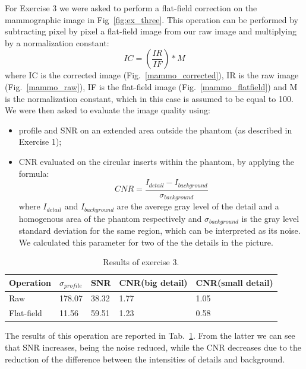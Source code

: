 \documentclass[a4paper]{article}
\begin{document}
For Exercise 3 we were asked to perform a flat-field correction on the mammographic image in Fig~\ref{fig:ex_three}. This operation can be performed by subtracting pixel by pixel a flat-field image from our raw image and multiplying by a normalization constant:
\begin{equation}
IC=(\frac{IR}{IF})* M
\end{equation}
where IC is the corrected image (Fig.~\ref{mammo_corrected}), IR is the raw image (Fig.~\ref{mammo_raw}), IF is the flat-field image (Fig.~\ref{mammo_flatfield}) and M is the normalization constant, which in this case is assumed to be equal to 100.
We were then asked to evaluate the image quality using:
\begin{itemize}
	\item profile and SNR on an extended area outside the phantom (as described in Exercise 1);
	\item CNR evaluated on the circular inserts within the phantom, by applying the formula:
	\begin{equation}
	CNR=\frac{I_{detail}-I_{background}}{\sigma_{background}}
	\end{equation}
	where $I_{detail}$ and $I_{background}$ are the averege gray level of the detail and a homogenous area of the phantom respectively and $\sigma_{background}$ is the gray level standard deviation for the same region, which can be interpreted as its noise. We calculated this parameter for two of the the details in the picture.
\end{itemize}

\begin{table}[h]
	\centering
	\begin{tabular}{| l | l | l | l | l |}
		\hline
		 Operation  & $\sigma_{profile}$ & SNR   & CNR(big detail) & CNR(small detail)\\ \hline
     Raw        & 178.07             & 38.32 & 1.77            & 1.05 \\ \hline
     Flat-field & 11.56              & 59.51 & 1.23            & 0.58 \\ \hline
	\end{tabular}
  \caption{Results of exercise 3.}
  \label{tab:ex_3}
\end{table}

The results of this operation are reported in Tab.~\ref{tab:ex_3}. From the latter we can see that SNR increases, being the noise reduced, while the CNR decreases due to the reduction of the difference between the intensities of details and background.
\end{document}
